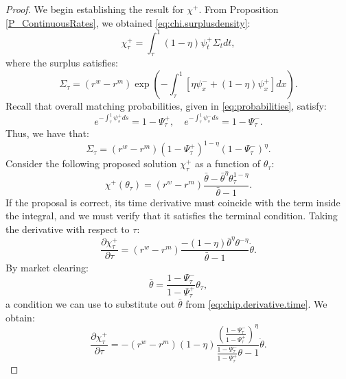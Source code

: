 \begin{proof}
We begin establishing the result for $\chi^+$. From Proposition \ref{P_ContinuousRates}, we obtained \eqref{eq:chi.surplusdensity}:
\begin{equation}
\chi^+_\tau = \int_\tau^1 (1-\eta) \psi^+_t \Sigma_t dt,
\end{equation}
where the surplus satisfies:
\begin{equation}
\Sigma_\tau = (r^w - r^m) \exp\left(-\int_\tau^1 [\eta\psi^-_x + (1-\eta)\psi^+_x] dx\right).
\end{equation}
Recall that overall matching probabilities, given in \eqref{eq:probabilities}, satisfy:
\begin{equation*}
e^{-\int_\tau^1 \psi^+_s ds} = 1 - \Psi_\tau^+, \quad  e^{-\int_\tau^1 \psi^-_s ds}= 1 - \Psi_\tau^-.
\end{equation*}
Thus, we have that:
\begin{equation}
\label{eq:SigmaProbs}
\Sigma_\tau = (r^w - r^m)(1-\Psi_\tau^+)^{1-\eta}(1-\Psi_\tau^-)^{\eta}.
\end{equation}
Consider the following proposed solution $\chi^+_\tau$ as a function of $\theta_\tau$:
\begin{equation}
\chi^+(\theta_\tau) = (r^w - r^m) \frac{\bar{\theta} - \bar{\theta}^{\eta}\theta_\tau^{1-\eta}}{\bar{\theta} - 1}.
\end{equation}
If the proposal is correct, its time derivative must coincide with the term inside the integral, and we must verify that it satisfies the terminal condition. Taking the derivative with respect to $\tau$:
\begin{equation}
\label{eq:chip.derivative.time}
\frac{\partial \chi_\tau^+}{\partial \tau} = (r^w - r^m) \frac{-(1-\eta)\bar{\theta}^{\eta}\theta^{-\eta}}{\bar{\theta} - 1} \dot{\theta}.
\end{equation}
By market clearing:
\begin{equation}
\label{eq:appendix.terminalinitialthetaprobs}
\bar{\theta}=\frac{1-\Psi^{-}_\tau}{1-\Psi^{+}_\tau}\theta_\tau,
\end{equation}
a condition we can use to substitute out $\bar{\theta}$ from \eqref{eq:chip.derivative.time}. We obtain:
\begin{equation}
\label{eq:chip.derivative.time2}
\frac{\partial \chi_\tau^+}{\partial \tau} = -(r^w - r^m)(1-\eta)\frac{\left(\frac{1-\Psi^{-}_\tau}{1-\Psi^{+}_\tau}\right)^{\eta}}{\frac{1-\Psi^{-}_\tau}{1-\Psi^{+}_\tau}\theta - 1} \dot{\theta}.
\end{equation}

\end{proof}
